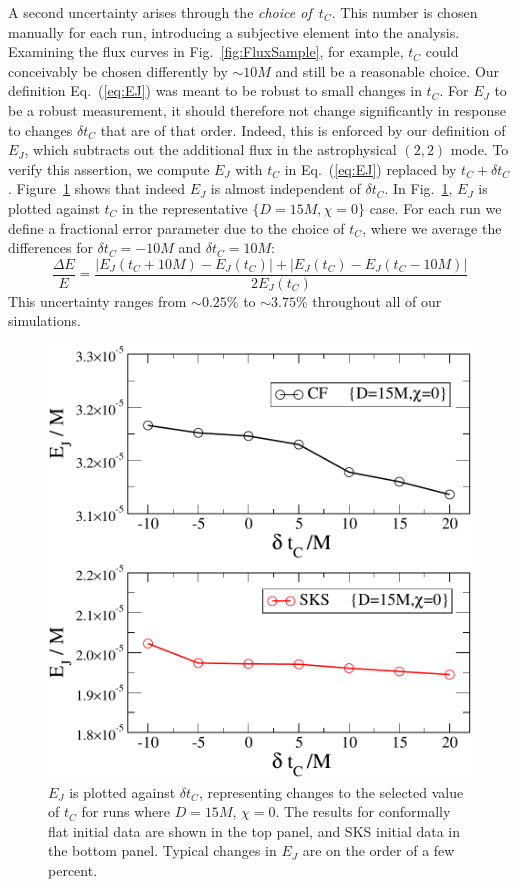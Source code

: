 A second uncertainty arises through the {\it choice of~$t_C$}.
This number is chosen manually for
each run, introducing a
  subjective element into the analysis. Examining the flux curves in
Fig.~\ref{fig:FluxSample}, for example, $t_C$ could conceivably be
chosen differently by $\sim 10 M$ and still be a
reasonable choice. {Our definition Eq.~(\ref{eq:EJ}) was meant
to be robust to small changes in $t_C$.  For $E_J$ to be a robust measurement, it should
therefore not change significantly in response to changes $\delta t_C$
that are of that order. Indeed, this is enforced by our definition of
$E_J$, which subtracts out the additional flux in the astrophysical
$(2,2)$ mode.}  To verify this assertion, we compute $E_J$ with $t_C$ in Eq.~(\ref{eq:EJ}) replaced by $t_C+\delta t_C$.  Figure~\ref{fig:EvsDtC} shows that indeed $E_J$ is almost independent of $\delta t_C$.  
In Fig.~\ref{fig:EvsDtC}, $E_J$ is plotted against $t_C$
in the representative $\{D=15M, \chi=0\}$ case.
For each run we define a fractional
error parameter due to the choice of $t_C$, where we average the
differences for $\delta t_C = -10M$ and $\delta t_C = 10M$:
\begin{equation}
\frac{\Delta E}{E} = \frac{|E_J(t_C+10M) - E_J(t_C)| + |E_J(t_C) - E_J(t_C -
  10M)|}{2E_J(t_C)}
\end{equation}
This uncertainty ranges from $\sim 0.25\%$ to $\sim 3.75\%$ throughout
all of our simulations.

\begin{figure}
 \includegraphics[width=0.95\columnwidth]{chap5/EvsDtj}
  \caption[$E_J$ as a function of $\delta t_C$.]{$E_J$ is plotted against $\delta t_C$, representing changes
    to the selected value of $t_C$ for runs where $D=15M$,
    $\chi=0$. The results for conformally flat initial data are shown
    in the top panel, and SKS initial data in the bottom
    panel. Typical changes in $E_J$ are on the order of a few
    percent.}
 \label{fig:EvsDtC}
\end{figure}


